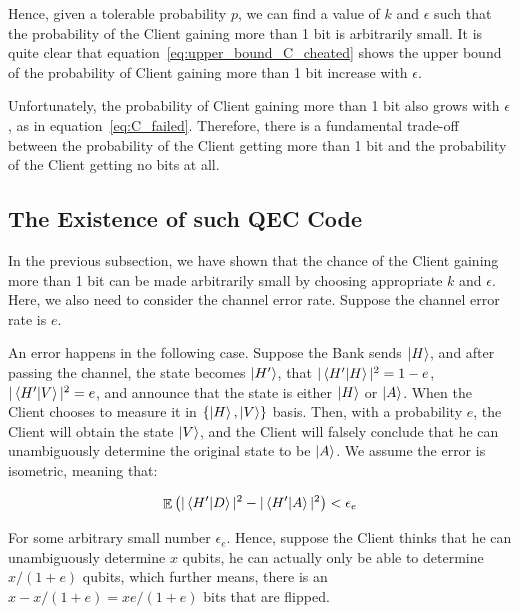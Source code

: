 \documentclass[%
 reprint,
superscriptaddress,
 amsmath,amssymb,
 aps,
]{revtex4-2}
\DeclareMathOperator{\EX}{\mathbb{E}}%
\begin{document}
Hence, given a tolerable probability $p$, we can find a value of $k$ and $\epsilon$ such that the probability of the Client gaining more than 1 bit is arbitrarily small. It is quite clear that equation~\ref{eq:upper_bound_C_cheated} shows the upper bound of the probability of Client gaining more than 1 bit increase with $\epsilon$.

Unfortunately, the probability of Client gaining more than 1 bit also grows with $\epsilon$, as in equation~\ref{eq:C_failed}. Therefore, there is a fundamental trade-off between the probability of the Client getting more than 1 bit and the probability of the Client getting no bits at all.

\subsection{The Existence of such QEC Code}
\label{sec:QECC_existence}



In the previous subsection, we have shown that the chance of the Client gaining more than 1 bit can be made arbitrarily small by choosing appropriate $k$ and $\epsilon$. Here, we also need to consider the channel error rate. Suppose the channel error rate is $e$. 

An error happens in the following case. Suppose the Bank sends $\ket{H}$, and after passing the channel, the state becomes $\ket{H'}$, that $|\bra{H'}\ket{H}|^2=1-e$, $|\bra{H'}\ket{V}|^2=e$, and announce that the state is either $\ket{H}$ or $\ket{A}$. When the Client chooses to measure it in $\{\ket{H},\ket{V}\}$ basis. Then, with a probability $e$, the Client will obtain the state $\ket{V}$, and the Client will falsely conclude that he can unambiguously determine the original state to be $\ket{A}$. We assume the error is isometric, meaning that:

\begin{equation}
    \EX{\left(|\bra{H'}\ket{D}|^2-|\bra{H'}\ket{A}|^2\right)<\epsilon_{e}}
\end{equation}

For some arbitrary small number $\epsilon_e$. Hence, suppose the Client thinks that he can unambiguously determine $x$ qubits, he can actually only be able to determine $x/(1+e)$ qubits, which further means, there is an $x-x/(1+e)=xe/(1+e)$ bits that are flipped. 
\end{document}
